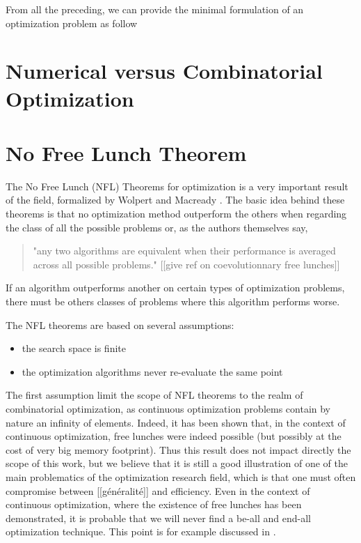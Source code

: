 From all the preceding, we can provide the minimal formulation of an optimization problem as follow 


\section{Numerical versus Combinatorial Optimization}

\section{No Free Lunch Theorem}

The No Free Lunch (NFL) Theorems for optimization is a very important result of the field, formalized by Wolpert and Macready \cite{585893}. The basic idea behind these theorems is that no optimization method outperform the others when regarding the class of all the possible problems or, as the authors themselves say,
\begin{quote}
"any two algorithms are equivalent when their performance is averaged across all possible problems." [[give ref on coevolutionnary free lunches]]
\end{quote}
If an algorithm outperforms another on certain types of optimization problems, there must be others classes of problems where this algorithm performs worse.

The NFL theorems are based on several assumptions:
\begin{itemize}

\item the search space is finite

\item the optimization algorithms never re-evaluate the same point

\end{itemize}

The first assumption limit the scope of NFL theorems to the realm of combinatorial optimization, as continuous optimization problems contain by nature an infinity of elements. Indeed, it has been shown that, in the context of continuous optimization, free lunches were indeed possible \cite{Auger-s00453-008-9244-5} (but possibly at the cost of very big memory footprint). Thus this result does not impact directly the scope of this work, but we believe that it is still a good illustration of one of the main problematics of the optimization research field, which is that one must often compromise between [[généralité]] and efficiency. Even in the context of continuous optimization, where the existence of free lunches has been demonstrated, it is probable that we will never find a be-all and end-all optimization technique. This point is for example discussed in \cite{Doe05}.

